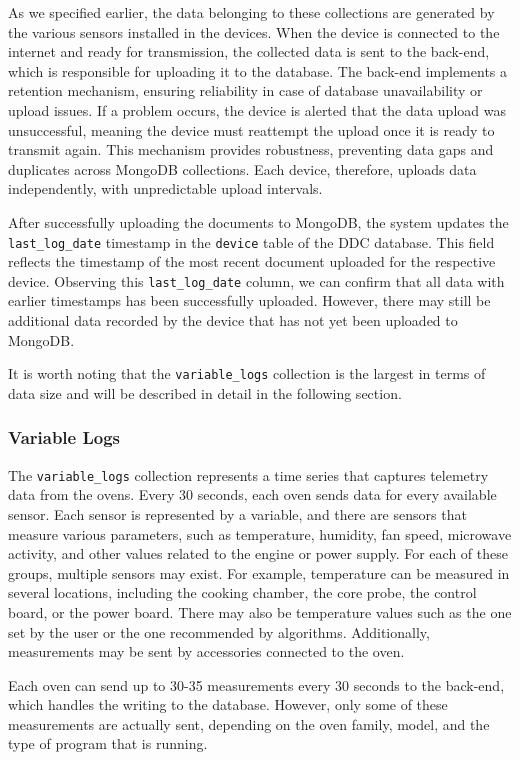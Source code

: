 As we specified earlier, the data belonging to these collections are generated by the various sensors installed in the devices. When the device is connected to the internet and ready for transmission, the collected data is sent to the back-end, which is responsible for uploading it to the database. The back-end implements a retention mechanism, ensuring reliability in case of database unavailability or upload issues. If a problem occurs, the device is alerted that the data upload was unsuccessful, meaning the device must reattempt the upload once it is ready to transmit again. This mechanism provides robustness, preventing data gaps and duplicates across MongoDB collections. Each device, therefore, uploads data independently, with unpredictable upload intervals.

After successfully uploading the documents to MongoDB, the system updates the \texttt{last\_log\_date} timestamp in the \texttt{device} table of the DDC database. This field reflects the timestamp of the most recent document uploaded for the respective device. Observing this \texttt{last\_log\_date} column, we can confirm that all data with earlier timestamps has been successfully uploaded. However, there may still be additional data recorded by the device that has not yet been uploaded to MongoDB.

It is worth noting that the \texttt{variable\_logs} collection is the largest in terms of data size and will be described in detail in the following section.
\subsubsection{Variable Logs}
The \texttt{variable\_logs} collection represents a time series that captures telemetry data from the ovens. Every 30 seconds, each oven sends data for every available sensor. Each sensor is represented by a variable, and there are sensors that measure various parameters, such as temperature, humidity, fan speed, microwave activity, and other values related to the engine or power supply. For each of these groups, multiple sensors may exist. For example, temperature can be measured in several locations, including the cooking chamber, the core probe, the control board, or the power board. There may also be temperature values such as the one set by the user or the one recommended by algorithms. Additionally, measurements may be sent by accessories connected to the oven.

Each oven can send up to 30-35 measurements every 30 seconds to the back-end, which handles the writing to the database. However, only some of these measurements are actually sent, depending on the oven family, model, and the type of program that is running.

